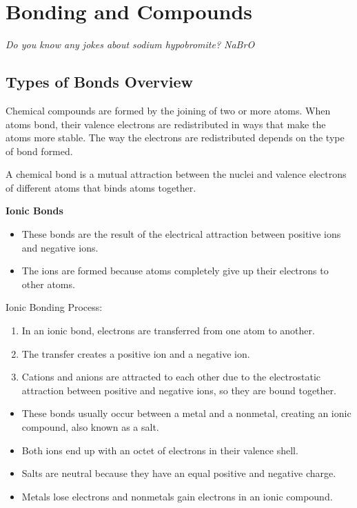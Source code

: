 \documentclass[../hchem.tex]{subfiles}
\begin{document}
\chapter{Bonding and Compounds}
\textit{Do you know any jokes about sodium hypobromite? NaBrO}

\section{Types of Bonds Overview}
Chemical compounds are formed by the joining of two or more atoms. When atoms bond, their 
valence electrons are redistributed in ways that make the atoms more stable. The way the electrons are redistributed 
depends on the type of bond formed.

A chemical bond is a mutual attraction between the nuclei and valence electrons of different atoms that binds atoms together.

\textbf{Ionic Bonds}
\begin{itemize}
    \item These bonds are the result of the electrical attraction between positive ions and negative ions.
    \item The ions are formed because atoms completely give up their electrons to other atoms.
\end{itemize}

Ionic Bonding Process:
\begin{enumerate}
    \item In an ionic bond, electrons are transferred from one atom to another.
    \item The transfer creates a positive ion and a negative ion.
    \item Cations and anions are attracted to each other due to the electrostatic attraction between positive and negative ions, so they are bound together.
\end{enumerate}

\begin{itemize}
    \item These bonds usually occur between a metal and a nonmetal, creating an ionic compound, also known as a salt.
    \item Both ions end up with an octet of electrons in their valence shell.
    \item Salts are neutral because they have an equal positive and negative charge.
    \item Metals lose electrons and nonmetals gain electrons in an ionic compound.
\end{itemize}
\end{document}
